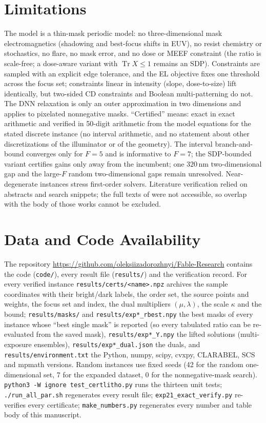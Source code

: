 \documentclass[11pt,a4paper]{article}
\newcommand{\SI}[2]{\ensuremath{#1\,\mathrm{#2}}}\newcommand{\SIrange}[3]{\ensuremath{#1\text{--}#2\,\mathrm{#3}}}
\theoremstyle{remark}\newtheorem*{remark}{Remark}
\DeclareMathOperator{\Tr}{Tr}\DeclareMathOperator{\rank}{rank}\DeclareMathOperator{\conj}{conj}
\begin{document}
\section{Limitations}
The model is a thin-mask periodic model: no three-dimensional mask electromagnetics (shadowing and best-focus shifts in EUV), no resist chemistry or stochastics, no flare, no mask error, and no dose or MEEF constraint (the ratio is scale-free; a dose-aware variant with $\Tr X\le1$ remains an SDP). Constraints are sampled with an explicit edge tolerance, and the EL objective fixes one threshold across the focus set; constraints linear in intensity (slope, dose-to-size) lift identically, but two-sided CD constraints and Boolean multi-patterning do not. The DNN relaxation is only an outer approximation in two dimensions and applies to pixelated nonnegative masks. ``Certified'' means: exact in exact arithmetic and verified in 50-digit arithmetic from the model equations for the stated discrete instance (no interval arithmetic, and no statement about other discretizations of the illuminator or of the geometry). The interval branch-and-bound converges only for $F=5$ and is informative to $F=7$; the SDP-bounded variant certifies gains only away from the incumbent; one \SI{320}{nm} two-dimensional gap and the large-$F$ random two-dimensional gaps remain unresolved. Near-degenerate instances stress first-order solvers. Literature verification relied on abstracts and search snippets; the full texts of \cite{rosenbluth2002,rosenbluth2007,liu1992,nonaka2025,nouralishahi2008} were not accessible, so overlap with the body of those works cannot be excluded.

\section*{Data and Code Availability}
The repository \url{https://github.com/oleksiizadorozhnyi/Fable-Research} contains the code (\texttt{code/}), every result file (\texttt{results/}) and the verification record. For every verified instance \texttt{results/certs/<name>.npz} archives the sample coordinates with their bright/dark labels, the order set, the source points and weights, the focus set and index, the dual multipliers $(\mu,\lambda)$, the scale $\kappa$ and the bound; \texttt{results/masks/} and \texttt{results/exp*\_rbest.npy} the best masks of every instance whose ``best single mask'' is reported (so every tabulated ratio can be re-evaluated from the saved mask), \texttt{results/exp*\_Y.npy} the lifted solutions (multi-exposure ensembles), \texttt{results/exp*\_dual.json} the duals, and \texttt{results/environment.txt} the Python, numpy, scipy, cvxpy, CLARABEL, SCS and mpmath versions. Random instances use fixed seeds (42 for the random one-dimensional set, 7 for the expanded dataset, 0 for the nonnegative-mask search). \texttt{python3 -W ignore test\_certlitho.py} runs the thirteen unit tests; \texttt{./run\_all\_par.sh} regenerates every result file; \texttt{exp21\_exact\_verify.py} re-verifies every certificate; \texttt{make\_numbers.py} regenerates every number and table body of this manuscript.
\end{document}
